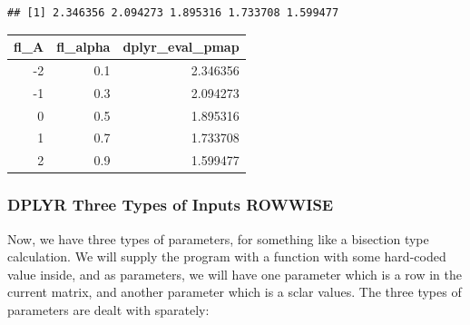 \documentclass[
]{book}
\newenvironment{Shaded}{\begin{snugshade}}{\end{snugshade}}
\newcommand{\CommentTok}[1]{\textcolor[rgb]{0.56,0.35,0.01}{\textit{#1}}}
\newcommand{\DataTypeTok}[1]{\textcolor[rgb]{0.13,0.29,0.53}{#1}}
\newcommand{\KeywordTok}[1]{\textcolor[rgb]{0.13,0.29,0.53}{\textbf{#1}}}
\newcommand{\NormalTok}[1]{#1}
\newcommand{\OperatorTok}[1]{\textcolor[rgb]{0.81,0.36,0.00}{\textbf{#1}}}
\newcommand{\StringTok}[1]{\textcolor[rgb]{0.31,0.60,0.02}{#1}}
\begin{document}
\begin{verbatim}
## [1] 2.346356 2.094273 1.895316 1.733708 1.599477
\end{verbatim}

\begin{Shaded}
\end{Shaded}

\begin{table}[!h]
\centering
\begin{tabular}{r|r|r}
\hline
fl\_A & fl\_alpha & dplyr\_eval\_pmap\\
\hline
\rowcolor{gray!6}  -2 & 0.1 & 2.346356\\
\hline
-1 & 0.3 & 2.094273\\
\hline
\rowcolor{gray!6}  0 & 0.5 & 1.895316\\
\hline
1 & 0.7 & 1.733708\\
\hline
\rowcolor{gray!6}  2 & 0.9 & 1.599477\\
\hline
\end{tabular}
\end{table}

\hypertarget{dplyr-three-types-of-inputs-rowwise}{%
\subsubsection{DPLYR Three Types of Inputs ROWWISE}\label{dplyr-three-types-of-inputs-rowwise}}

Now, we have three types of parameters, for something like a bisection type calculation. We will supply the program with a function with some hard-coded value inside, and as parameters, we will have one parameter which is a row in the current matrix, and another parameter which is a sclar values. The three types of parameters are dealt with sparately:
\end{document}
